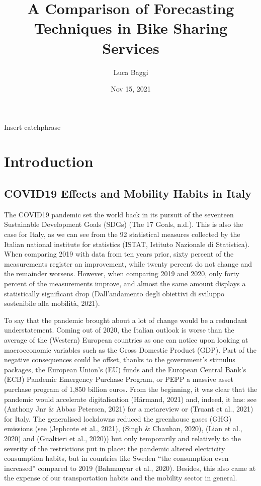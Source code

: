 \documentclass[letterpaper,10pt,english]{jupyterBook}
\title{A Comparison of Forecasting Techniques in Bike Sharing Services}
\date{Nov 15, 2021}
\author{Luca Baggi}
\begin{document}
\pagestyle{empty}
\sphinxmaketitle
\pagestyle{plain}
\sphinxtableofcontents
\pagestyle{normal}
\label{\detokenize{frontmatter::doc}}


\sphinxAtStartPar
Insert catchphrase


\chapter{Introduction}
\label{\detokenize{01-introduction:introduction}}\label{\detokenize{01-introduction::doc}}

\section{COVID\sphinxhyphen{}19 Effects and Mobility Habits in Italy}
\label{\detokenize{01-introduction:covid-19-effects-and-mobility-habits-in-italy}}
\sphinxAtStartPar
The COVID\sphinxhyphen{}19 pandemic set the world back in its pursuit of the seventeen Sustainable Development Goals (SDGs) (The 17 Goals, n.d.). This is also the case for Italy, as we can see from the 92 statistical measures collected by the Italian national institute for statistics (ISTAT, Istituto Nazionale di Statistica). When comparing 2019 with data from ten years prior, sixty percent of the measurements register an improvement, while twenty percent do not change and the remainder worsens. However, when comparing 2019 and 2020, only forty percent of the measurements improve, and almost the same amount displays a statistically significant drop (Dall’andamento degli obiettivi di sviluppo sostenibile alla mobilità, 2021).

\sphinxAtStartPar
To say that the pandemic brought about a lot of change would be a redundant understatement. Coming out of 2020, the Italian outlook is worse than the average of the (Western) European countries \sphinxhyphen{} as one can notice upon looking at macroeconomic variables such as the Gross Domestic Product (GDP). Part of the negative consequences could be offset, thanks to the government’s stimulus packages, the European Union’s (EU) funds and the European Central Bank’s (ECB) Pandemic Emergency Purchase Program, or PEPP \sphinxhyphen{} a massive asset purchase program of 1,850 billion euros. From the beginning, it was clear that the pandemic would accelerate digitalisation (Härmand, 2021) \sphinxhyphen{} and, indeed, it has: see (Anthony Jnr \& Abbas Petersen, 2021) for a meta\sphinxhyphen{}review or (Truant et al., 2021) for Italy. The generalised lockdowns reduced the greenhouse gases (GHG) emissions (see (Jephcote et al., 2021), (Singh \& Chauhan, 2020), (Lian et al., 2020) and (Gualtieri et al., 2020)) but only temporarily and relatively to the severity of the restrictions put in place: the pandemic altered electricity consumption habits, but in countries like Sweden “the consumption even increased” compared to 2019 (Bahmanyar et al., 2020). Besides, this also came at the expense of our transportation habits and the mobility sector in general.
\end{document}
